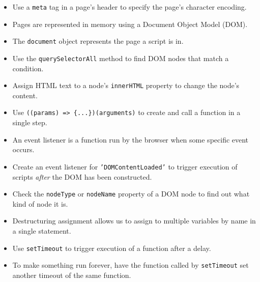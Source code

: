 \begin{itemize}
\item
  Use a \texttt{meta} tag in a page's header to specify the page's character encoding.
\item
  Pages are represented in memory using a Document Object Model (DOM).
\item
  The \texttt{document} object represents the page a script is in.
\item
  Use the \texttt{querySelectorAll} method to find DOM nodes that match a condition.
\item
  Assign HTML text to a node's \texttt{innerHTML} property to change the node's content.
\item
  Use \texttt{((params)\ =\textgreater{}\ \{...\})(arguments)} to create and call a function in a single step.
\item
  An event listener is a function run by the browser when some specific event occurs.
\item
  Create an event listener for \texttt{'DOMContentLoaded'} to trigger execution of scripts \emph{after} the DOM has been constructed.
\item
  Check the \texttt{nodeType} or \texttt{nodeName} property of a DOM node to find out what kind of node it is.
\item
  Destructuring assignment allows us to assign to multiple variables by name in a single statement.
\item
  Use \texttt{setTimeout} to trigger execution of a function after a delay.
\item
  To make something run forever, have the function called by \texttt{setTimeout} set another timeout of the same function.
\end{itemize}
